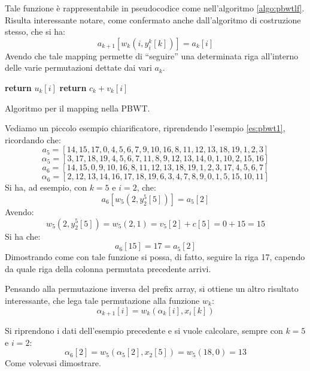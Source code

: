 Tale funzione è rappresentabile in pseudocodice come nell'algoritmo
\ref{algo:pbwtlf}. \\
Risulta interessante notare, come confermato anche dall'algoritmo di costruzione
stesso, che si ha:
\begin{equation}
  \label{eq:pbwt3}
  a_{k+1}\left[w_k\left(i,y_i^k[k]\right)\right]=a_k[i]
\end{equation}
Avendo che tale mapping permette di ``seguire'' una determinata riga
all'interno delle varie permutazioni dettate dai vari $a_k$.
\begin{algorithm}
  \small
  \begin{algorithmic}[1]
    \State \textbf{return} $u_k[i]$
    \Else
    \State \textbf{return} $c_k+v_k[i]$
    \EndIf
    \EndFunction
  \end{algorithmic}
  \caption{Algoritmo per il mapping nella PBWT.}
  \label{algo:pbwtlf}
\end{algorithm}
\begin{esempio}
  Vediamo un piccolo esempio chiarificatore, riprendendo l'esempio
  \ref{es:pbwt1}, ricordando che:
  \[a_5=[14,15,17,0,4,5,6,7,9,10,16,8,11,12,13,18,19,1,2,3]\]
  \[\alpha_5=[3,17,18,19,4,5,6,7,11,8,9,12,13,14,0,1,10,2,15,16]\]
  \[a_6=[14,15,0,9,10,16,8,11,12,13,18,19,1,2,3,17,4,5,6,7]\]
  \[\alpha_6=[2,12,13,14,16,17,18,19,6,3,4,7,8,9,0,1,5,15,10,11]\]
  Si ha, ad esempio, con $k=5$ e $i=2$, che:
  \[a_{6}\left[w_5\left(2,y_2^5[5]\right)\right]=a_5[2]\]
  Avendo:
  \[w_5\left(2,y_2^5[5]\right)=w_5\left(2,1\right)=v_5[2]+c[5]=0+15=15\]
  Si ha che:
  \[a_{6}[15]=17=a_5[2]\]
  Dimostrando come con tale funzione si possa, di fatto, seguire la riga 17,
  capendo da quale riga della colonna permutata precedente arrivi.
\end{esempio}
\noindent
Pensando alla permutazione inversa del prefix array, si
ottiene un altro risultato interessante, che lega tale permutazione alla
funzione $w_k$:
\begin{equation}
  \label{eq:pbwtw4}
  \alpha_{k+1}[i]=w_k(\alpha_k[i],x_i[k])
\end{equation}
\begin{esempio}
  Si riprendono i dati dell'esempio precedente e si vuole calcolare, sempre con
  $k=5$ e $i=2$:
  \[\alpha_{6}[2]=w_5(\alpha_5[2],x_2[5])=w_5(18,0)=13\]
  Come volevasi dimostrare.
\end{esempio}
